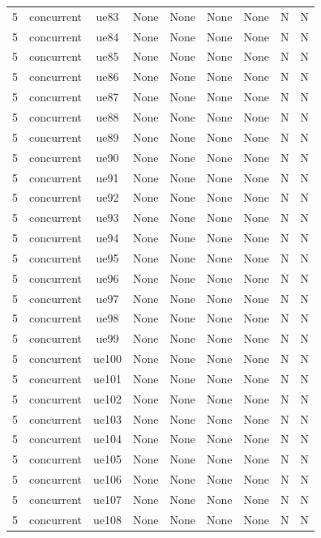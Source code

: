 \begin{table}[ht]
\begin{tabular}{|c|c|c|c|c|c|c|c|c|}
5 & concurrent & ue83 & None & None & None & None & N & N \\
5 & concurrent & ue84 & None & None & None & None & N & N \\
5 & concurrent & ue85 & None & None & None & None & N & N \\
5 & concurrent & ue86 & None & None & None & None & N & N \\
5 & concurrent & ue87 & None & None & None & None & N & N \\
5 & concurrent & ue88 & None & None & None & None & N & N \\
5 & concurrent & ue89 & None & None & None & None & N & N \\
5 & concurrent & ue90 & None & None & None & None & N & N \\
5 & concurrent & ue91 & None & None & None & None & N & N \\
5 & concurrent & ue92 & None & None & None & None & N & N \\
5 & concurrent & ue93 & None & None & None & None & N & N \\
5 & concurrent & ue94 & None & None & None & None & N & N \\
5 & concurrent & ue95 & None & None & None & None & N & N \\
5 & concurrent & ue96 & None & None & None & None & N & N \\
5 & concurrent & ue97 & None & None & None & None & N & N \\
5 & concurrent & ue98 & None & None & None & None & N & N \\
5 & concurrent & ue99 & None & None & None & None & N & N \\
5 & concurrent & ue100 & None & None & None & None & N & N \\
5 & concurrent & ue101 & None & None & None & None & N & N \\
5 & concurrent & ue102 & None & None & None & None & N & N \\
5 & concurrent & ue103 & None & None & None & None & N & N \\
5 & concurrent & ue104 & None & None & None & None & N & N \\
5 & concurrent & ue105 & None & None & None & None & N & N \\
5 & concurrent & ue106 & None & None & None & None & N & N \\
5 & concurrent & ue107 & None & None & None & None & N & N \\
5 & concurrent & ue108 & None & None & None & None & N & N \\

\end{tabular}
\end{table}
